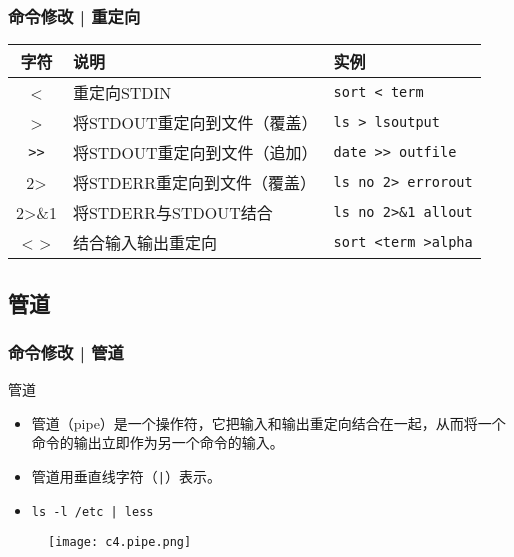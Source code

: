 \begin{frame}[fragile]
  \frametitle{命令修改 | \alert{重定向}}
  \begin{table}
    \centering
    \begin{tabular}{cll}
      \hline
      \rowcolor{blue!50}字符 & 说明 & 实例\\
      \hline
      < & 重定向STDIN & \verb|sort < term|\\
      > & 将STDOUT重定向到文件（覆盖） & \verb|ls > lsoutput|\\
      \verb|>>| & 将STDOUT重定向到文件（追加） & \verb|date >> outfile|\\
      2> & 将STDERR重定向到文件（覆盖） & \verb|ls no 2> errorout|\\
      2>\&1 & 将STDERR与STDOUT结合 & \verb|ls no 2>&1 allout|\\
      < > & 结合输入输出重定向 & \verb|sort <term >alpha|\\
      \hline
    \end{tabular}
  \end{table}
\end{frame}

\subsection{管道}
\begin{frame}[fragile]
  \frametitle{命令修改 | \alert{管道}}
  \begin{block}{管道}
    \begin{itemize}
      \item 管道（pipe）是一个操作符，它把输入和输出重定向结合在一起，从而将一个命令的输出立即作为另一个命令的输入。
      \item 管道用垂直线字符（\verb=|=）表示。
      \item \verb=ls -l /etc | less=
    \end{itemize}
  \end{block}
  \begin{figure}
    \centering
    \texttt{[image: c4.pipe.png]}
  \end{figure}
\end{frame}

